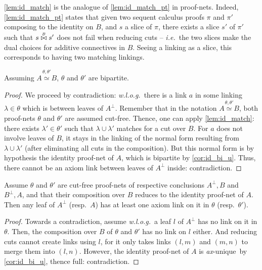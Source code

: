 \documentclass{lmcs}
\newcommand*{\orth}{^\perp} %
\newcommand*{\ie}{\emph{i.e.}}
\newcommand*{\wolog}{\emph{w.l.o.g.}}
\newcommand*{\resp}{resp.}
\newcommand*{\iso}{\mathrel{\simeq}} %
\newcommand{\symboltext}[2]{\mathrel{\overset{\makebox[0pt]{\mbox{\normalfont\tiny\sffamily \ensuremath{#1}}}}{#2}}} %
\newcommand*{\cutf}[3]{\ensuremath{#1\symboltext{#3}{\bowtie} #2}}
\newcommand{\isoproofs}[4]{\overset{\ensuremath{#3,#4}}{#1\iso #2}}
\newcommand*{\unique}{\textit{ax}-unique}
\begin{document}
\begin{rem}
\label{rem:id_match_pt}
\autoref{lem:id_match} is the analogue of \autoref{lem:id_match_pt} in proof-nets.
Indeed, \autoref{lem:id_match_pt} states that given two sequent calculus proofs $\pi$ and $\pi'$ composing to the identity on $B$, and $s$ a slice of $\pi$, there exists a slice $s'$ of $\pi'$ such that $\cutf{s}{s'}{B}$  does not fail when reducing cuts -- \ie\ the two slices make the dual choices for additive connectives in $B$.
Seeing a linking as a slice, this corresponds to having two matching linkings.
\end{rem}

\begin{cor}
\label{cor:id_qbi}
Assuming $\isoproofs{A}{B}{\theta}{\theta'}$, $\theta$ and $\theta'$ are bipartite.
\end{cor}
\begin{proof}
We proceed by contradiction: \wolog\ there is a link $a$ in some linking $\lambda\in\theta$ which is between leaves of $A\orth$.
Remember that in the notation $\isoproofs{A}{B}{\theta}{\theta'}$, both proof-nets $\theta$ and $\theta'$ are assumed cut-free.
Thence, one can apply \autoref{lem:id_match}: there exists $\lambda'\in\theta'$ such that $\lambda\cup\lambda'$ matches for a cut over $B$.
For $a$ does not involve leaves of $B$, it stays in the linking of the normal form resulting from $\lambda\cup\lambda'$ (after eliminating all cuts in the composition).
But this normal form is by hypothesis the identity proof-net of $A$, which is bipartite by \autoref{cor:id_bi_u}.
Thus, there cannot be an axiom link between leaves of $A\orth$ inside: contradiction.
\end{proof}

\begin{lem}
\label{lem:ret_half_full}
Assume $\theta$ and $\theta'$ are cut-free proof-nets of respective conclusions $A\orth,B$ and $B\orth,A$, and that their composition over $B$ reduces to the identity proof-net of $A$.
Then any leaf of $A\orth$ (\resp\ $A$) has at least one axiom link on it in $\theta$ (\resp\ $\theta'$).
\end{lem}
\begin{proof}
Towards a contradiction, assume \wolog\ a leaf $l$ of $A\orth$ has no link on it in $\theta$.
Then, the composition over $B$ of $\theta$ and $\theta'$ has no link on $l$ either.
And reducing cuts cannot create links using $l$, for it only takes links $(l,m)$ and $(m,n)$ to merge them into $(l,n)$.
However, the identity proof-net of $A$ is \unique\ by \autoref{cor:id_bi_u}, thence full: contradiction.
\end{proof}
\end{document}
